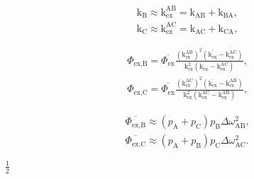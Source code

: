 \documentclass[a4paper,11pt,twoside,openright]{book}
\def\lthtmlcheckvsize{\ifdim\ht\sizebox<\vsize 
  \ifdim\wd\sizebox<\hsize\expandafter\hfill\fi \expandafter\vfill
  \else\expandafter\vss\fi}%
\begin{document}
{\newpage\clearpage
\setcounter{equation}{18}
%
\begin{subequations}\begin{align}
&\textrm{k}_{\textrm{B}}\approx \textrm{k}_{\textrm{ex}}^{\textrm{AB}}= \textrm{k}_{\textrm{AB}}+ \textrm{k}_{\textrm{BA}}, \\
&\textrm{k}_{\textrm{C}}\approx \textrm{k}_{\textrm{ex}}^{\textrm{AC}}= \textrm{k}_{\textrm{AC}}+ \textrm{k}_{\textrm{CA}},
\end{align}\end{subequations}%
\lthtmldisplayZ
\lthtmlcheckvsize\clearpage}

{\newpage\clearpage
\setcounter{equation}{19}
%
\begin{subequations}\begin{align}
&\Phi_{\textrm{ex,B}}= \overline{\Phi_{\textrm{ex}}} \frac{\left(\textrm{k}_{\textrm{ex}}^{\textrm{AB}}\right)^2 \left( \overline{\textrm{k}_{\textrm{ex}}} - \textrm{k}_{\textrm{ex}}^{\textrm{AC}}\right)}{\textrm{k}_{\textrm{ex}}^2 \left( \textrm{k}_{\textrm{ex}}- \textrm{k}_{\textrm{ex}}^{\textrm{AC}}\right)} ,\\
&\Phi_{\textrm{ex,C}}= \overline{\Phi_{\textrm{ex}}} \frac{\left(\textrm{k}_{\textrm{ex}}^{\textrm{AC}}\right)^2 \left( \overline{\textrm{k}_{\textrm{ex}}} - \textrm{k}_{\textrm{ex}}^{\textrm{AB}}\right)}{\textrm{k}_{\textrm{ex}}^2 \left( \textrm{k}_{\textrm{ex}}^{\textrm{AC}}- \textrm{k}_{\textrm{ex}}^{\textrm{AB}}\right)} ,\end{align}\end{subequations}%
\lthtmldisplayZ
\lthtmlcheckvsize\clearpage}

{\newpage\clearpage
\setcounter{equation}{20}
%
\begin{subequations}\begin{align}
&\overline{\Phi_{\textrm{ex,B}}} \approx (p_{\textrm{A}}+ p_{\textrm{C}}) p_{\textrm{B}}\Delta\omega_{\textrm{AB}}^2 , \\
&\overline{\Phi_{\textrm{ex,C}}} \approx (p_{\textrm{A}}+ p_{\textrm{B}}) p_{\textrm{C}}\Delta\omega_{\textrm{AC}}^2 .
\end{align}\end{subequations}%
\lthtmldisplayZ
\lthtmlcheckvsize\clearpage}

{\newpage\clearpage
{}%
$\displaystyle {\frac{{1}}{{2}}}$%
\lthtmlindisplaymathZ
\lthtmlcheckvsize\clearpage}
\end{document}
